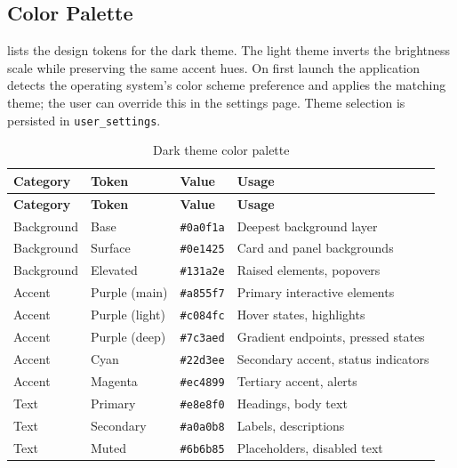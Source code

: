\documentclass[a4paper, 11pt, oneside]{report}
\begin{document}
\subsection{Color Palette}

 lists the design tokens for the dark theme.  The
light theme inverts the brightness scale while preserving the same accent
hues.  On first launch the application detects the operating system's color
scheme preference and applies the matching theme; the user can override
this in the settings page.  Theme selection is persisted in
\texttt{user\_settings}.

\begin{longtable}{l l l L{5.5cm}}
  \caption{Dark theme color palette}
  \label{tab:color-palette} \\
  \toprule
  \textbf{Category} & \textbf{Token} & \textbf{Value} &
    \textbf{Usage} \\
  \midrule
  \endfirsthead
  \toprule
  \textbf{Category} & \textbf{Token} & \textbf{Value} &
    \textbf{Usage} \\
  \midrule
  \endhead
  Background & Base      & \texttt{\#0a0f1a} & Deepest background layer \\
  Background & Surface   & \texttt{\#0e1425} & Card and panel backgrounds \\
  Background & Elevated  & \texttt{\#131a2e} & Raised elements, popovers \\
  \midrule
  Accent & Purple (main)  & \texttt{\#a855f7} & Primary interactive elements \\
  Accent & Purple (light) & \texttt{\#c084fc} & Hover states, highlights \\
  Accent & Purple (deep)  & \texttt{\#7c3aed} & Gradient endpoints, pressed
                                                 states \\
  Accent & Cyan           & \texttt{\#22d3ee} & Secondary accent, status
                                                 indicators \\
  Accent & Magenta        & \texttt{\#ec4899} & Tertiary accent, alerts \\
  \midrule
  Text & Primary   & \texttt{\#e8e8f0} & Headings, body text \\
  Text & Secondary & \texttt{\#a0a0b8} & Labels, descriptions \\
  Text & Muted     & \texttt{\#6b6b85} & Placeholders, disabled text \\
  \bottomrule
\end{longtable}
\end{document}
